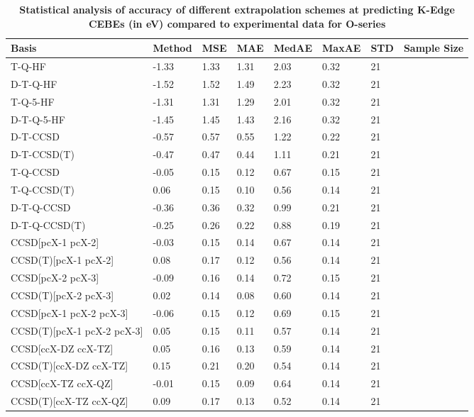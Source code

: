 \begin{table}
  \caption{\textbf{Statistical analysis of accuracy of different extrapolation schemes at predicting K-Edge CEBEs (in eV) compared to experimental data for O-series}}
  \label{tbl:extrap-scheme-summary-o}
  \begin{tabular}{l l l l l l l l }
    \toprule
    \textbf{Basis} & \textbf{Method} & \textbf{MSE} & \textbf{MAE} & \textbf{MedAE} & \textbf{MaxAE} & \textbf{STD} & \textbf{Sample Size} \\ 
    \midrule
    T-Q-HF & -1.33 & 1.33 & 1.31 & 2.03 & 0.32 & 21 \\ 
    D-T-Q-HF & -1.52 & 1.52 & 1.49 & 2.23 & 0.32 & 21 \\ 
    T-Q-5-HF & -1.31 & 1.31 & 1.29 & 2.01 & 0.32 & 21 \\ 
    D-T-Q-5-HF & -1.45 & 1.45 & 1.43 & 2.16 & 0.32 & 21 \\ 
    D-T-CCSD & -0.57 & 0.57 & 0.55 & 1.22 & 0.22 & 21 \\ 
    D-T-CCSD(T) & -0.47 & 0.47 & 0.44 & 1.11 & 0.21 & 21 \\ 
    T-Q-CCSD & -0.05 & 0.15 & 0.12 & 0.67 & 0.15 & 21 \\ 
    T-Q-CCSD(T) & 0.06 & 0.15 & 0.10 & 0.56 & 0.14 & 21 \\ 
    D-T-Q-CCSD & -0.36 & 0.36 & 0.32 & 0.99 & 0.21 & 21 \\ 
    D-T-Q-CCSD(T) & -0.25 & 0.26 & 0.22 & 0.88 & 0.19 & 21 \\ 
    CCSD[pcX-1 pcX-2] & -0.03 & 0.15 & 0.14 & 0.67 & 0.14 & 21 \\ 
    CCSD(T)[pcX-1 pcX-2] & 0.08 & 0.17 & 0.12 & 0.56 & 0.14 & 21 \\ 
    CCSD[pcX-2 pcX-3] & -0.09 & 0.16 & 0.14 & 0.72 & 0.15 & 21 \\ 
    CCSD(T)[pcX-2 pcX-3] & 0.02 & 0.14 & 0.08 & 0.60 & 0.14 & 21 \\ 
    CCSD[pcX-1 pcX-2 pcX-3] & -0.06 & 0.15 & 0.12 & 0.69 & 0.15 & 21 \\ 
    CCSD(T)[pcX-1 pcX-2 pcX-3] & 0.05 & 0.15 & 0.11 & 0.57 & 0.14 & 21 \\ 
    CCSD[ccX-DZ ccX-TZ] & 0.05 & 0.16 & 0.13 & 0.59 & 0.14 & 21 \\ 
    CCSD(T)[ccX-DZ ccX-TZ] & 0.15 & 0.21 & 0.20 & 0.54 & 0.14 & 21 \\ 
    CCSD[ccX-TZ ccX-QZ] & -0.01 & 0.15 & 0.09 & 0.64 & 0.14 & 21 \\ 
    CCSD(T)[ccX-TZ ccX-QZ] & 0.09 & 0.17 & 0.13 & 0.52 & 0.14 & 21 \\ 

\end{tabular}
\end{table}
